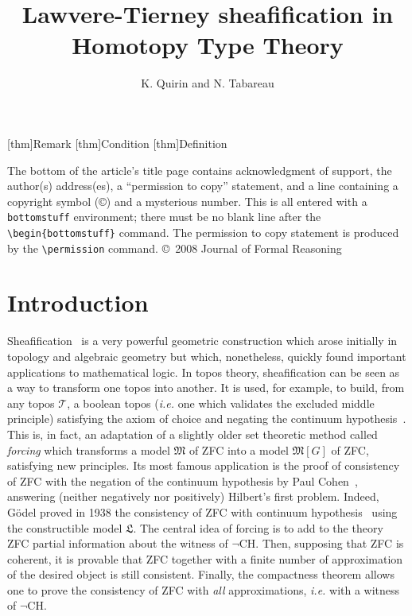 \documentclass[notfinal]{jfrarticle}
\title{Lawvere-Tierney sheafification in Homotopy Type Theory}
\author{K. Quirin and N. Tabareau}
{Kevin Quirin\\ \'{E}cole des Mines de Nantes, France
  \and
  Nicolas Tabareau\\Inria, France}
\newcommand{\ie}{\emph{i.e.}}
\begin{document}
\newtheorem{thm}{Theorem}[section]
\newtheorem{prop}[thm]{Proposition}%
\newtheorem{lem}[thm]{Lemma}%
[thm]{Remark}%
[thm]{Condition}%
[thm]{Definition}%


\begin{bottomstuff}

The bottom of the article's title page contains acknowledgment of
support, the author(s) address(es), a ``permission to copy'' statement,
and a line containing a copyright symbol (\copyright) and a mysterious
number.  This is all entered with a {\tt bottomstuff} environment;
there must be no blank line after the \verb|\begin{bottomstuff}|
command.  The permission to copy statement is produced by the
\verb|\permission| command.
\permission
\copyright\ 2008 Journal of Formal Reasoning
\end{bottomstuff}

\maketitle

\section{Introduction}


Sheafification~\cite{maclanemoerdijk} is a very powerful geometric
construction which arose initially in topology and algebraic geometry but which,
nonetheless, quickly found important applications to mathematical logic.
%
In topos theory, sheafification can be seen as a way to transform one
topos into another. It is used, for example, to build, from any topos
$\mathcal T$, a boolean topos (\ie{} one which validates the excluded
middle principle) satisfying the axiom of choice and negating the
continuum hypothesis~\cite[Theorem VI.2.1]{maclanemoerdijk}.  This is,
in fact, an adaptation of a slightly older set theoretic method called
{\em forcing} which transforms a model $\mathfrak M$ of ZFC into a
model $\mathfrak M[G]$ of ZFC, satisfying new principles. Its most
famous application is the proof of consistency of ZFC with the
negation of the continuum hypothesis by Paul Cohen~\cite{cohen1966},
answering (neither negatively nor positively) Hilbert's first
problem. Indeed, Gödel proved in 1938 the consistency of ZFC with
continuum hypothesis~\cite{godel1938} using the constructible model
$\mathfrak L$.  The central idea of forcing is to add to the
theory ZFC partial information about the witness of $\lnot$CH.  Then,
supposing that ZFC is coherent, it is provable that ZFC together with
a finite number of approximation of the desired object is still
consistent. Finally, the compactness theorem allows one to prove the
consistency of ZFC with {\em all} approximations, \ie{} with a witness
of $\lnot$CH.
\end{document}
